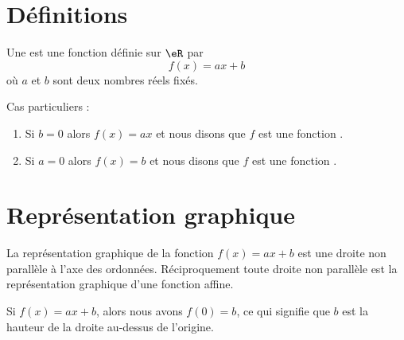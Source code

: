 
\section{Définitions}

\begin{definition}
    Une  est une fonction définie sur \( \eR\) par
    \begin{equation}
        f(x)=ax+b
    \end{equation}
    où \( a\) et \( b\) sont deux nombres réels fixés.
\end{definition}

Cas particuliers :
\begin{enumerate}
    \item
        Si \( b=0\) alors \( f(x)=ax\) et nous disons que \( f\) est une fonction .
    \item
        Si \( a=0\) alors \( f(x)=b\) et nous disons que \( f\) est une fonction .
\end{enumerate}

\section{Représentation graphique}

\begin{Aretenir}
    La représentation graphique de la fonction \( f(x)=ax+b\) est une droite non parallèle à l'axe des ordonnées. Réciproquement toute droite non parallèle est la représentation graphique d'une fonction affine.
\end{Aretenir}

Si \( f(x)=ax+b\), alors nous avons \( f(0)=b\), ce qui signifie que \( b\) est la hauteur de la droite au-dessus de l'origine.


